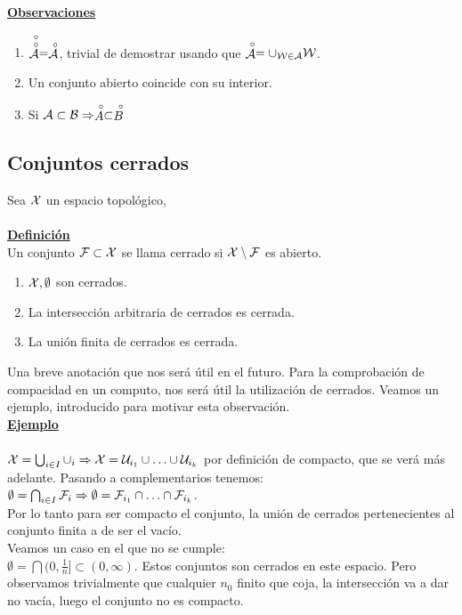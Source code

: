 \textbf{\underline{Observaciones}}
\begin{enumerate}
	\item $\stackrel{\ \circ}{\stackrel{\ \circ}{\mathcal{A}}} = \stackrel{\ \circ}{\mathcal{A}}$, trivial de demostrar usando que $\stackrel{\ \circ}{\mathcal{A}} = \cup_{\mathcal{W}\in\mathcal{A}}\mathcal{W}$.
	\item Un conjunto abierto coincide con su interior.
	\item Si $\mathcal{A} \subset \mathcal{B} \Rightarrow \stackrel{\ \circ}{A} \subset \stackrel{\ \circ}{B}$
\end{enumerate}

\subsection{Conjuntos cerrados}
Sea $\mathcal{X}$ un espacio topológico,\\
\\
\textbf{\underline{Definición}}\\
Un conjunto $\mathcal{F} \subset \mathcal{X}$ se llama cerrado si $\mathcal{X} \setminus \mathcal{F}$ es abierto.
\begin{enumerate}
	\item $\mathcal{X}, \emptyset $ son cerrados.
	\item La intersección arbitraria de cerrados es cerrada.
	\item La unión finita de cerrados es cerrada.
\end{enumerate}
Una breve anotación que nos será útil en el futuro. Para la comprobación de compacidad en un computo, nos será útil la utilización de cerrados. Veamos un ejemplo, introducido para motivar esta observación.\\

\textbf{\underline{Ejemplo}}\\
\\
$\mathcal{X} = \bigcup_{i \in I}\cup_{i} \Rightarrow \mathcal{X} = \mathcal{U}_{i_{1}} \cup \ldots \cup \mathcal{U}_{i_{k}}$ por definición de compacto, que se verá más adelante. Pasando a complementarios tenemos:\\
$\emptyset = \bigcap_{i \in I}\mathcal{F}_{i} \Rightarrow \emptyset = \mathcal{F}_{i_{1}} \cap \ldots \cap \mathcal{F}_{i_{k}}$.\\
Por lo tanto para ser compacto el conjunto, la unión de cerrados pertenecientes al conjunto finita a de ser el vacío.\\
Veamos un caso en el que no se cumple:\\
$\emptyset = \bigcap(0,\frac{1}{n}] \subset (0,\infty)$. Estos conjuntos son cerrados en este espacio. Pero observamos trivialmente que cualquier $n_0$ finito que coja, la intersección va a dar no vacía, luego el conjunto no es compacto.
